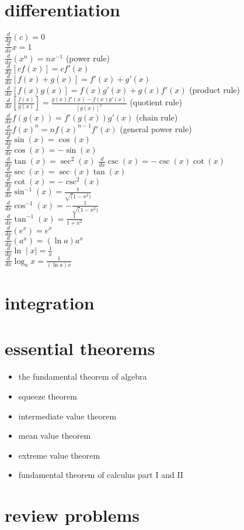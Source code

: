 \documentclass{article}
\begin{document}
\section*{differentiation}
$\frac{d}{dx}(c) = 0$\\
$\frac{d}{dx}x = 1$\\
$\frac{d}{dx}(x^n) = nx^{-1}$ (power rule)\\
$\frac{d}{dx}[cf(x)] = cf'(x)$\\
$\frac{d}{dx}[f(x)+g(x)] = f'(x) + g'(x)$\\
$\frac{d}{dx}[f(x)g(x)] = f(x)g'(x) + g(x)f'(x)$ (product rule)\\
$\frac{d}{dx}[\frac{f(x)}{g(x)}] = \frac{g(x)f'(x) - f(x)g'(x)}{[g(x)]^2}$ (quotient rule)\\
$\frac{d}{dx}f(g(x)) = f'(g(x))g'(x)$ (chain rule)\\
$\frac{d}{dx}f(x)^n = nf(x)^{n-1}f'(x)$ (general power rule)\\
$\frac{d}{dx}\sin(x) = \cos(x)$\\ 
$\frac{d}{dx}\cos(x) = -\sin(x)$\\
$\frac{d}{dx}\tan(x) = \sec^2(x)$
$\frac{d}{dx}\csc(x) = -\csc(x)\cot(x)$\\
$\frac{d}{dx}\sec(x) = \sec(x)\tan(x)$\\
$\frac{d}{dx}\cot(x) = -\csc^2(x)$\\
$\frac{d}{dx}\sin^{-1}(x) = \frac{1}{\sqrt(1 - x^2)}$\\
$\frac{d}{dx}\cos^{-1}(x) = -\frac{1}{\sqrt(1 - x^2)}$\\
$\frac{d}{dx}\tan^{-1}(x) = \frac{1}{1 + x^2}$\\
$\frac{d}{dx}(e^x) = e^x$\\
$\frac{d}{dx}(a^x) = (\ln a)a^x$\\
$\frac{d}{dx}\ln\mid x\mid = \frac{1}{x}$\\
$\frac{d}{dx}\log_ax = \frac{1}{(\ln a)x}$\\

\section*{integration}



\section*{essential theorems}
	\begin{itemize}
		\item the fundamental theorem of algebra
		\item squeeze theorem
		\item intermediate value theorem
		\item mean value theorem
		\item extreme value theorem
		\item fundamental theorem of calculus part I and II
	\end{itemize}

\newpage
\section*{review problems}
\end{document}
